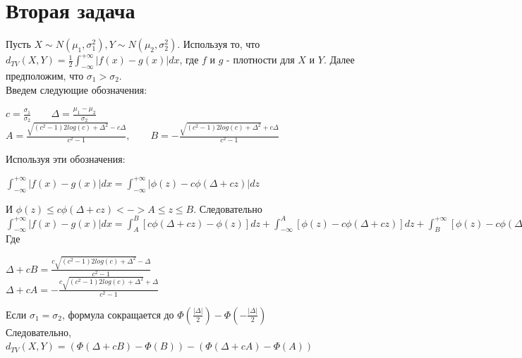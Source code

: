 \documentclass{article}
\begin{document}
\section{Вторая задача}
Пусть $X \sim N(\mu_1, \sigma_1^2), Y \sim N(\mu_2, \sigma_2^2).$ Используя то, что $d_{TV}(X, Y) = \frac{1}{2}\int_{-\infty}^{+\infty} |f(x) - g(x)|dx$, где $f$ и $g$ - плотности для $X$ и $Y$. Далее предположим, что $\sigma_1 > \sigma_2$.\\
Введем следующие обозначения:
\begin{center}
$c = \frac{\sigma_1}{\sigma_2} \qquad \Delta = \frac{\mu_1 - \mu_2}{\sigma_2}$\\
$A = \frac{\sqrt{(c^2 - 1)2log(c) + \Delta^2} - c\Delta}{c^2 - 1}, \qquad B = -\frac{\sqrt{(c^2 - 1)2log(c) + \Delta^2} + c\Delta}{c^2 - 1}$
\end{center}
Используя эти обозначения:
\begin{center}
$\int_{-\infty}^{+\infty} |f(x) - g(x)|dx = \int_{-\infty}^{+\infty} |\phi(z) - c\phi(\Delta + cz)|dz$
\end{center}
И $\phi(z) \leq c\phi(\Delta + cz) <-> A \leq z \leq B$. Следовательно\\
$\int_{-\infty}^{+\infty}|f(x) - g(x)|dx = \int_A^B [c\phi(\Delta + cz) - \phi(z)]dz + \int_{-\infty}^A [\phi(z) - c\phi(\Delta + cz)]dz + \int_B^{+\infty}[\phi(z) - c\phi(\Delta + cz)]dz = 2[(\Phi(\Delta + cB) - \Phi(B)) - (\Phi(\Delta + cA) - \Phi(A))].$\\
Где 
\begin{center}
$\Delta + cB = \frac{c\sqrt{(c^2 - 1)2log(c) + \Delta^2} - \Delta}{c^2 - 1}$\\
$\Delta + cA = -\frac{c\sqrt{(c^2 - 1)2log(c) + \Delta^2} + \Delta}{c^2 - 1}$
\end{center}
Если $\sigma_1 = \sigma_2$, формула сокращается до $\Phi(\frac{|\Delta|}{2}) - \Phi(-\frac{|\Delta|}{2})$\\
Следовательно, $d_{TV}(X,Y) = (\Phi(\Delta + cB) - \Phi(B)) - (\Phi(\Delta + cA) - \Phi(A))$
\end{document}
